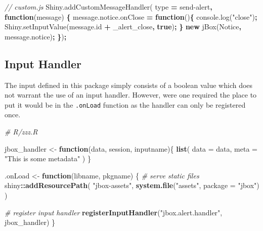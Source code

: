 \documentclass[
]{krantz}
\makeatletter
\newenvironment{Shaded}{\begin{snugshade}}{\end{snugshade}}
\newcommand{\AttributeTok}[1]{\textcolor[rgb]{0.61,0.61,0.61}{#1}}
\newcommand{\CommentTok}[1]{\textcolor[rgb]{0.37,0.37,0.37}{\textit{#1}}}
\newcommand{\ControlFlowTok}[1]{\textcolor[rgb]{0.27,0.27,0.27}{\textbf{#1}}}
\newcommand{\DataTypeTok}[1]{\textcolor[rgb]{0.27,0.27,0.27}{#1}}
\newcommand{\KeywordTok}[1]{\textcolor[rgb]{0.27,0.27,0.27}{\textbf{#1}}}
\newcommand{\NormalTok}[1]{#1}
\newcommand{\OperatorTok}[1]{\textcolor[rgb]{0.43,0.43,0.43}{\textbf{#1}}}
\newcommand{\StringTok}[1]{\textcolor[rgb]{0.5,0.5,0.5}{#1}}
\newcommand{\VariableTok}[1]{\textcolor[rgb]{0,0,0}{#1}}
\newenvironment{kframe}{%
\medskip{}
\setlength{\fboxsep}{.8em}
 \def\at@end@of@kframe{}%
 \ifinner\ifhmode%
  \def\at@end@of@kframe{\end{minipage}}%
  \begin{minipage}{\columnwidth}%
 \fi\fi%
 \def\FrameCommand##1{\hskip\@totalleftmargin \hskip-\fboxsep
 \colorbox{shadecolor}{##1}\hskip-\fboxsep
     \hskip-\linewidth \hskip-\@totalleftmargin \hskip\columnwidth}%
 \MakeFramed {\advance\hsize-\width
   \@totalleftmargin\z@ \linewidth\hsize
   \@setminipage}}%
 {\par\unskip\endMakeFramed%
 \at@end@of@kframe}
\renewenvironment{Shaded}{\begin{kframe}}{\end{kframe}}
\makeatother
\begin{document}
\begin{Shaded}
\begin{Highlighting}[]
\CommentTok{// custom.js}
\VariableTok{Shiny}\NormalTok{.}\AttributeTok{addCustomMessageHandler}\NormalTok{(}
\NormalTok{  type }\OperatorTok{=} \StringTok{\textquotesingle{}send{-}alert\textquotesingle{}}\OperatorTok{,} \KeywordTok{function}\NormalTok{(message) }\OperatorTok{\{}
    \VariableTok{message}\NormalTok{.}\VariableTok{notice}\NormalTok{.}\AttributeTok{onClose} \OperatorTok{=} \KeywordTok{function}\NormalTok{()}\OperatorTok{\{}
      \VariableTok{console}\NormalTok{.}\AttributeTok{log}\NormalTok{(}\StringTok{"close"}\NormalTok{)}\OperatorTok{;}
      \VariableTok{Shiny}\NormalTok{.}\AttributeTok{setInputValue}\NormalTok{(}\VariableTok{message}\NormalTok{.}\AttributeTok{id} \OperatorTok{+} \StringTok{\textquotesingle{}\_alert\_close\textquotesingle{}}\OperatorTok{,} \KeywordTok{true}\NormalTok{)}\OperatorTok{;}
    \OperatorTok{\}}
    \KeywordTok{new} \AttributeTok{jBox}\NormalTok{(}\StringTok{\textquotesingle{}Notice\textquotesingle{}}\OperatorTok{,} \VariableTok{message}\NormalTok{.}\AttributeTok{notice}\NormalTok{)}\OperatorTok{;}
\OperatorTok{\}}\NormalTok{)}\OperatorTok{;}
\end{Highlighting}
\end{Shaded}

\hypertarget{input-handler}{%
\subsection{Input Handler}\label{input-handler}}

The input defined in this package simply consists of a boolean value which does not warrant the use of an input handler. However, were one required the place to put it would be in the \texttt{.onLoad} function as the handler can only be registered once.

\begin{Shaded}
\begin{Highlighting}[]
\CommentTok{\# R/zzz.R}

\NormalTok{jbox\_handler <{-}}\StringTok{ }\ControlFlowTok{function}\NormalTok{(data, session, inputname)\{}
  \KeywordTok{list}\NormalTok{(}
    \DataTypeTok{data =}\NormalTok{ data,}
    \DataTypeTok{meta =} \StringTok{"This is some metadata"}
\NormalTok{  )}
\NormalTok{\}}

\NormalTok{.onLoad <{-}}\StringTok{ }\ControlFlowTok{function}\NormalTok{(libname, pkgname) \{}
  \CommentTok{\# serve static files}
\NormalTok{  shiny}\OperatorTok{::}\KeywordTok{addResourcePath}\NormalTok{(}
    \StringTok{"jbox{-}assets"}\NormalTok{,}
    \KeywordTok{system.file}\NormalTok{(}\StringTok{"assets"}\NormalTok{, }\DataTypeTok{package =} \StringTok{"jbox"}\NormalTok{)}
\NormalTok{  )}

  \CommentTok{\# register input handler}
  \KeywordTok{registerInputHandler}\NormalTok{(}\StringTok{"jbox.alert.handler"}\NormalTok{, jbox\_handler)}
\NormalTok{\}}
\end{Highlighting}
\end{Shaded}
\end{document}

